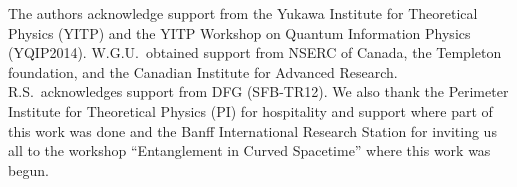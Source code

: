 \documentclass[aps,prd,showpacs,amssymb,nofootinbib,12pt]{revtex4-2}
\begin{document}
\acknowledgments

The authors acknowledge support from the 
Yukawa Institute for Theoretical Physics (YITP) 
and the YITP Workshop on Quantum Information Physics (YQIP2014).  
%
W.G.U.\ obtained support from NSERC of Canada, the Templeton foundation, 
and the Canadian Institute for Advanced Research.
%
R.S.\ acknowledges support from DFG (SFB-TR12). 
%
We also thank the Perimeter Institute for Theoretical Physics (PI)
for hospitality and support where part of this work was done
and the Banff International Research Station for inviting us all to the 
workshop ``Entanglement in Curved Spacetime'' where this work was begun. 
\end{document}
